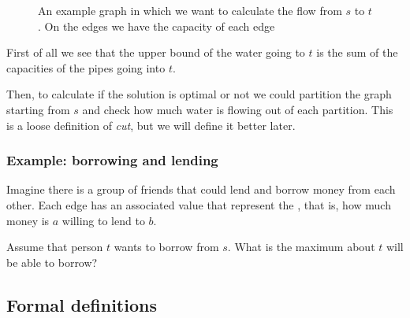 \documentclass[14pt]{extarticle}
\begin{document}
\begin{figure}[H]
    \centering
    \caption{An example graph in which we want to calculate the flow from $s$ to $t$. On the edges we have the capacity of each edge}
    \label{fig:flow}
\end{figure}

First of all we see that the upper bound of the water going to $t$ is the sum of the capacities of the pipes going into $t$.

Then, to calculate if the solution is optimal or not we could partition the graph starting from $s$ and check how much water is flowing out of each partition.
This is a loose definition of \emph{cut}, but we will define it better later.

\subsubsection{Example: borrowing and lending}

Imagine there is a group of friends that could lend and borrow money from each other.
Each edge has an associated value that represent the , that is, how much money is $a$ willing to lend to $b$.

Assume that person $t$ wants to borrow from $s$. What is the maximum about $t$ will be able to borrow?

\subsection{Formal definitions}
\end{document}
